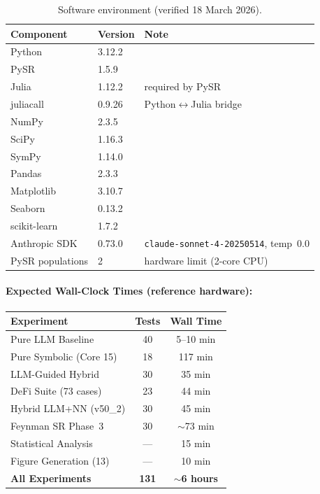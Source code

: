 \documentclass[twoside,11pt]{article}
\begin{document}
\begin{table}[H]
\centering
\caption{Software environment (verified 18 March 2026).}
\label{tab:runtime_reproducibility}
\small
\begin{tabular}{@{}lll@{}}
\toprule
\textbf{Component} & \textbf{Version} & \textbf{Note} \\
\midrule
Python       & 3.12.2  & \\
PySR         & 1.5.9   & \\
Julia        & 1.12.2  & required by PySR \\
juliacall    & 0.9.26  & Python$\leftrightarrow$Julia bridge \\
NumPy        & 2.3.5   & \\
SciPy        & 1.16.3  & \\
SymPy        & 1.14.0  & \\
Pandas       & 2.3.3   & \\
Matplotlib   & 3.10.7  & \\
Seaborn      & 0.13.2  & \\
scikit-learn & 1.7.2   & \\
Anthropic SDK & 0.73.0 & \texttt{claude-sonnet-4-20250514}, temp~0.0 \\
\midrule
PySR populations & 2 & hardware limit (2-core CPU) \\
\bottomrule
\end{tabular}
\end{table}

\paragraph{Expected Wall-Clock Times (reference hardware):}
\begin{small}
\begin{tabular}{@{}lcc@{}}
\toprule
\textbf{Experiment} & \textbf{Tests} & \textbf{Wall Time} \\
\midrule
Pure LLM Baseline          & 40  & 5--10 min \\
Pure Symbolic (Core 15)    & 18  & 117 min \\
LLM-Guided Hybrid          & 30  & 35 min \\
DeFi Suite (73 cases)      & 23  & 44 min \\
Hybrid LLM+NN (v50\_2)     & 30  & 45 min \\
Feynman SR Phase~3         & 30  & $\sim$73 min \\
Statistical Analysis       & --- & 15 min \\
Figure Generation (13)     & --- & 10 min \\
\midrule
\textbf{All Experiments}   & \textbf{131} & \textbf{$\sim$6 hours} \\
\bottomrule
\end{tabular}
\end{small}
\end{document}
